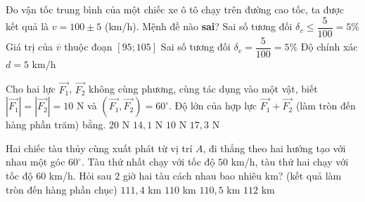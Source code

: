 \begin{ex}%
   Đo vận tốc trung bình của một chiếc xe ô tô chạy trên đường cao tốc, ta được kết quả là $v=100\pm 5$ (km/h). Mệnh đề nào \textbf{sai}?
   \choice
   {Sai số tương đối $\delta_v \leq \dfrac{5}{100}=5\%$}
   {Giá trị của $\overline{v}$ thuộc đoạn $[95;105]$}
   {\True Sai số tương đối $\delta_v = \dfrac{5}{100}=5\%$}
   {Độ chính xác $d=5$ km/h}
\end{ex}

\begin{ex}%
   Cho hai lực $\overrightarrow{F_1}$, $\overrightarrow{F_2}$ không cùng phương, cùng tác dụng vào một vật, biết $\left|\overrightarrow{F_1}\right| = \left|\overrightarrow{F_2}\right| = 10$ N và $\left(\overrightarrow{F_1},\overrightarrow{F_2}\right)=60^\circ$. Độ lớn của hợp lực $\overrightarrow{F_1} + \overrightarrow{F_2}$ (làm tròn đến hàng phần trăm) bằng.
   \choice
   {$20$ N}
   {$14{,}1$ N}
   {$10$ N}
   {\True $17{,}3$ N}
\end{ex}

\begin{ex}%
   Hai chiếc tàu thủy cùng xuất phát từ vị trí $A$, đi thẳng theo hai hướng tạo với nhau một góc $60^\circ$. Tàu thứ nhất chạy với tốc độ $50$ km/h, tàu thứ hai chạy với tốc độ $60$ km/h. Hỏi sau $2$ giờ hai tàu cách nhau bao nhiêu km? (kết quả làm tròn đến hàng phần chục)
   \choice
   {\True $111{,}4$ km}
   {$110$ km}
   {$110{,}5$ km}
   {$112$ km}
\end{ex}

